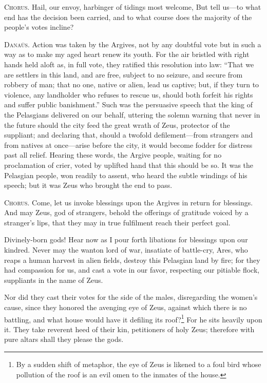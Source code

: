 \documentclass[12pt]{article}
\begin{document}
\textsc{Chorus.} Hail, our envoy, harbinger of tidings most welcome, But tell us---to what end has the decision been carried, and to what course does the majority of the people's votes incline?

\textsc{Dana\"{u}s.} Action was taken by the Argives, not by any doubtful vote but in such a way as to make my aged heart renew its youth. For the air bristled with right hands held aloft as, in full vote, they ratified this resolution into law: ``That we are settlers in this land, and are free, subject to no seizure, and secure from robbery of man; that no one, native or alien, lead us captive; but, if they turn to violence, any landholder who refuses to rescue us, should both forfeit his rights and suffer public banishment.'' Such was the persuasive speech that the king of the Pelasgians delivered on our behalf, uttering the solemn warning that never in the future should the city feed the great wrath of Zeus, protector of the suppliant; and declaring that, should a twofold defilement---from strangers and from natives at once---arise before the city, it would become fodder for distress past all relief. Hearing these words, the Argive people, waiting for no proclamation of crier, voted by uplifted hand that this should be so. It was the Pelasgian people, won readily to assent, who heard the subtle windings of his speech; but it was Zeus who brought the end to pass.

\textsc{Chorus.} Come, let us invoke blessings upon the Argives in return for blessings. And may Zeus, god of strangers, behold the offerings of gratitude voiced by a stranger's lips, that they may in true fulfilment reach their perfect goal.

Divinely-born gods! Hear now as I pour forth libations for blessings upon our kindred. Never may the wanton lord of war, insatiate of battle-cry, Ares, who reaps a human harvest in alien fields, destroy this Pelasgian land by fire; for they had compassion for us, and cast a vote in our favor, respecting our pitiable flock, suppliants in the name of Zeus.

Nor did they cast their votes for the side of the males, disregarding the women's cause, since they honored the avenging eye of Zeus, against which there is no battling, and what house would have it defiling its roof?\footnote{By a sudden shift of metaphor, the eye of Zeus is likened to a foul bird whose pollution of the roof is an evil omen to the inmates of the house.} For he sits heavily upon it. They take reverent heed of their kin, petitioners of holy Zeus; therefore with pure altars shall they please the gods.
\end{document}
